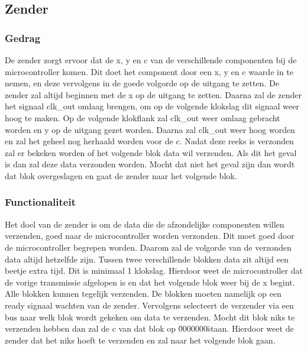 \subsection{Zender}

\subsubsection{Gedrag}
De zender zorgt ervoor dat de x, y en c van de verschillende componenten bij de microcontroller komen. Dit doet het component door een x, y en c waarde in te nemen, en deze vervolgens in de goede volgorde op de uitgang te zetten. De zender zal altijd beginnen met de x op de uitgang te zetten. Daarna zal de zender het signaal clk\_out omlaag brengen, om op de volgende klokslag dit signaal weer hoog te maken. Op de volgende klokflank zal clk\_out weer omlaag gebracht worden en y op de uitgang gezet worden. Daarna zal clk\_out weer hoog worden en zal het geheel nog herhaald worden voor de c. Nadat deze reeks is verzonden zal er bekeken worden of het volgende blok data wil verzenden. Als dit het geval is dan zal deze data verzonden worden. Mocht dat niet het geval zijn dan wordt dat blok overgeslagen en gaat de zender naar het volgende blok.

\subsubsection{Functionaliteit}
Het doel van de zender is om de data die de afzondelijke componenten willen verzenden, goed naar de microcontroller worden verzonden. Dit moet goed door de microcontroller begrepen worden. Daarom zal de volgorde van de verzonden data altijd hetzelfde zijn. Tussen twee verschillende blokken data zit altijd een beetje extra tijd. Dit is minimaal 1 klokslag. Hierdoor weet de microcontroller dat de vorige transmissie afgelopen is en dat het volgende blok weer bij de x begint.\\
Alle blokken kunnen tegelijk verzenden. De blokken moeten namelijk op een ready signaal wachten van de zender. Vervolgens selecteert de verzender via een bus naar welk blok wordt gekeken om data te verzenden. Mocht dit blok niks te verzenden hebben dan zal de c van dat blok op \"0000000\" staan. Hierdoor weet de zender dat het niks hoeft te verzenden en zal naar het volgende blok gaan.

